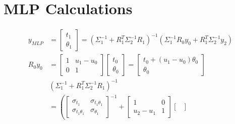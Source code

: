 \documentclass{article}
\begin{document}
    \section{MLP Calculations}
        \begin{align*}
            \!\!\!\!\!\!\!\!\!\!\!\!\!\!\!\!\!\!\!\!\!\!
            y_{MLP} &=
            \begin{bmatrix}
                t_1\\
                \theta_1
            \end{bmatrix}
            = \left( \Sigma_1^{-1} + R_1^T \Sigma_2^{-1} R_1 \right)^{-1}\left( \Sigma_1^{-1} R_0 y_0 + R_1^T \Sigma_2^{-1} y_2 \right)
            \\
            \!\!\!\!\!\!\!\!\!\!\!\!\!\!\!\!\!\!\!\!\!\!
            R_0y_0 &=
            \begin{bmatrix}
                1 & u_1-u_0\\
                0 & 1
            \end{bmatrix}
            \begin{bmatrix}
                t_0\\
                \theta_0
            \end{bmatrix}
            =
            \begin{bmatrix}
                t_0+\left(u_1-u_0\right)\theta_0\\
                \theta_0
            \end{bmatrix}
            \\
            &\left( \Sigma_1^{-1} + R_1^T \Sigma_2^{-1} R_1 \right)^{-1}\\
            &=
            \left(
            \begin{bmatrix}
                \sigma_{t_1} & \sigma_{t_1\theta_1}\\
                \sigma_{t_1\theta_1} & \sigma_{\theta_1}
            \end{bmatrix}^{-1}
            +
            \begin{bmatrix}
                1 &0\\
                u_2-u_1 & 1
            \end{bmatrix}
            \begin{bmatrix}

\end{bmatrix}
\end{align*}
\end{document}
